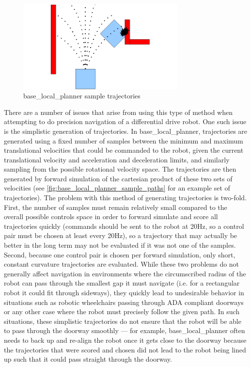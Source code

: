 \begin{figure}
\centering
\includegraphics[width=0.75\textwidth]{images/base_local_planner_sample_paths}
\caption{base\_local\_planner sample trajectories \autocite{BaseLocalPlannerWiki} \label{fig:base_local_planner_sample_paths}}
\end{figure}

There are a number of issues that arise from using this type of method when attempting to do precision navigation of a differential drive robot. One such issue is the simplistic generation of trajectories. In base\_local\_planner, trajectories are generated using a fixed number of samples between the minimum and maximum translational velocities that could be commanded to the robot, given the current translational velocity and acceleration and deceleration limits, and similarly sampling from the possible rotational velocity space. The trajectories are then generated by forward simulation of the cartesian product of these two sets of velocities (see \autoref{fig:base_local_planner_sample_paths} for an example set of trajectories). The problem with this method of generating trajectories is two-fold. First, the number of samples must remain relatively small compared to the overall possible controls space in order to forward simulate and score all trajectories quickly (commands should be sent to the robot at 20Hz, so a control pair must be chosen at least every 20Hz), so a trajectory that may actually be better in the long term may not be evaluated if it was not one of the samples. Second, because one control pair is chosen per forward simulation, only short, constant curvature trajectories are evaluated. While these two problems do not generally affect navigation in environments where the circumscribed radius of the robot can pass through the smallest gap it must navigate (i.e. for a rectangular robot it could fit through sideways), they quickly lead to undesirable behavior in situations such as robotic wheelchairs passing through ADA compliant doorways or any other case where the robot must precisely follow the given path. In such situations, these simplistic trajectories do not ensure that the robot will be able to pass through the doorway smoothly --- for example, base\_local\_planner often needs to back up and re-align the robot once it gets close to the doorway because the trajectories that were scored and chosen did not lead to the robot being lined up such that it could pass straight through the doorway. 


